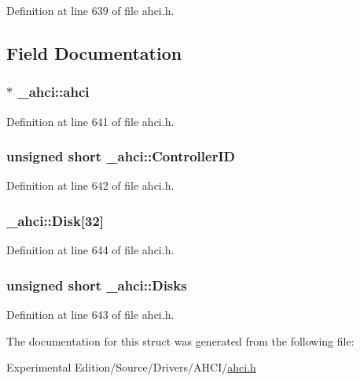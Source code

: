 Definition at line 639 of file ahci.\+h.



\subsection{Field Documentation}
\subsubsection[{\texorpdfstring{ahci}{ahci}}]{$\ast$ \+\_\+ahci\+::ahci}\hypertarget{struct__ahci_ae21f72444b86864fa029b0386bce745c}{}\label{struct__ahci_ae21f72444b86864fa029b0386bce745c}


Definition at line 641 of file ahci.\+h.

\subsubsection[{\texorpdfstring{Controller\+ID}{ControllerID}}]{\setlength{\rightskip}{0pt plus 5cm}unsigned short \+\_\+ahci\+::\+Controller\+ID}\hypertarget{struct__ahci_a767cb219a1220db83c0c934c5b9f260f}{}\label{struct__ahci_a767cb219a1220db83c0c934c5b9f260f}


Definition at line 642 of file ahci.\+h.

\subsubsection[{\texorpdfstring{Disk}{Disk}}]{ \+\_\+ahci\+::\+Disk\mbox{[}32\mbox{]}}\hypertarget{struct__ahci_ae0b46ff5a72b27e8d91fa39d5bd70a74}{}\label{struct__ahci_ae0b46ff5a72b27e8d91fa39d5bd70a74}


Definition at line 644 of file ahci.\+h.

\subsubsection[{\texorpdfstring{Disks}{Disks}}]{\setlength{\rightskip}{0pt plus 5cm}unsigned short \+\_\+ahci\+::\+Disks}\hypertarget{struct__ahci_a8964e69e694ed4ae3a4990889324eaa8}{}\label{struct__ahci_a8964e69e694ed4ae3a4990889324eaa8}


Definition at line 643 of file ahci.\+h.



The documentation for this struct was generated from the following file\+:\begin{DoxyCompactItemize}
\item 
Experimental Edition/\+Source/\+Drivers/\+A\+H\+C\+I/\hyperlink{ahci_8h}{ahci.\+h}\end{DoxyCompactItemize}
